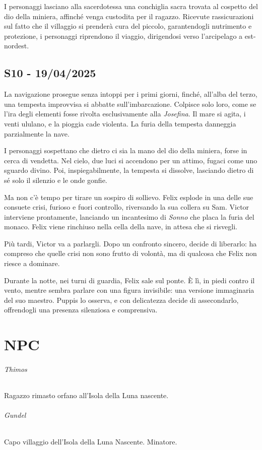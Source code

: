 \documentclass[letterpaper,twocolumn,openany, nodeprecatedcode, nomultitoc]{dndbook}
\begin{document}
I personaggi lasciano alla sacerdotessa una conchiglia sacra trovata al cospetto del dio della miniera, affinché venga custodita per il ragazzo. Ricevute rassicurazioni sul fatto che il villaggio si prenderà cura del piccolo, garantendogli nutrimento e protezione, i personaggi riprendono il viaggio, dirigendosi verso l’arcipelago a est-nordest.

\section{S10 - 19/04/2025}
La navigazione prosegue senza intoppi per i primi giorni, finché, all’alba del terzo, una tempesta improvvisa si abbatte sull’imbarcazione. Colpisce solo loro, come se l’ira degli elementi fosse rivolta esclusivamente alla \textit{Josefina}. Il mare si agita, i venti ululano, e la pioggia cade violenta. La furia della tempesta danneggia parzialmente la nave.

I personaggi sospettano che dietro ci sia la mano del dio della miniera, forse in cerca di vendetta. Nel cielo, due luci si accendono per un attimo, fugaci come uno sguardo divino. Poi, inspiegabilmente, la tempesta si dissolve, lasciando dietro di sé solo il silenzio e le onde gonfie.

Ma non c'è tempo per tirare un sospiro di sollievo. Felix esplode in una delle sue consuete crisi, furioso e fuori controllo, riversando la sua collera su Sam. Victor interviene prontamente, lanciando un incantesimo di \textit{Sonno} che placa la furia del monaco. Felix viene rinchiuso nella cella della nave, in attesa che si risvegli.

Più tardi, Victor va a parlargli. Dopo un confronto sincero, decide di liberarlo: ha compreso che quelle crisi non sono frutto di volontà, ma di qualcosa che Felix non riesce a dominare.

Durante la notte, nei turni di guardia, Felix sale sul ponte. È lì, in piedi contro il vento, mentre sembra parlare con una figura invisibile: una versione immaginaria del suo maestro. Puppis lo osserva, e con delicatezza decide di assecondarlo, offrendogli una presenza silenziosa e comprensiva.


\chapter{NPC}

\subparagraph{Thimos} Ragazzo rimasto orfano all'Isola della Luna nascente.

\subparagraph{Gundel} Capo villaggio dell'Isola della Luna Nascente. Minatore.
\end{document}
